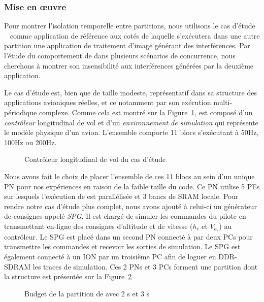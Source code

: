 \documentclass[main.tex]{subfiles}
\begin{document}
\subsubsection{Mise en \oe{}uvre}
Pour montrer l'isolation temporelle entre partitions, nous utilisons le cas d'étude \rosace~\cite{Pagetti2014} comme application de référence aux cotés de laquelle s'exécutera dans une autre partition une application de traitement d'image générant des interférences. Par l'étude du comportement de \rosace dans plusieurs scénarios de concurrence, nous cherchons à montrer son insensibilité aux interférences générées par la deuxième application.

Le cas d'étude \rosace est, bien que de taille modeste, représentatif dans sa structure des applications avioniques réelles, et ce notamment par son exécution multi-périodique complexe. Comme cela est montré sur la Figure~\ref{fig_resumeFr_rosace}, \rosace est composé d'un \emph{contrôleur} longitudinal de vol et d'un \emph{environnement de simulation} qui représente le modèle physique d'un avion. L'ensemble comporte 11 blocs s'exécutant à 50Hz, 100Hz ou 200Hz. 


\begin{figure}
    \centering
    \scalebox{1.5}{}
    \caption{Contrôleur longitudinal de vol du cas d'étude \rosace}
    \label{fig_resumeFr_rosace}
\end{figure}

Nous avons fait le choix de placer l'ensemble de ces 11 blocs au sein d'un unique PN pour nos expériences en raison de la faible taille du code. Ce PN utilise 5 PEs sur lesquels l'exécution de \rosace est parallélisée et 3 bancs de SRAM locale. Pour rendre notre cas d'étude plus complet, nous avons ajouté à celui-ci un générateur de consignes appelé \emph{SPG}. Il est chargé de simuler les commandes du pilote en transmettant en-ligne des consignes d'altitude et de vitesse ($h_c$ et $V_{a_c}$) au contrôleur. Le SPG est placé dans un second PN connecté à \rosace par deux PCs pour transmettre les commandes et recevoir les sorties de simulation. Le SPG est également connecté à un ION par un troisième PC afin de loguer en DDR-SDRAM les traces de simulation. Ces 2 PNs et 3 PCs forment une partition dont la structure est présentée sur la Figure~\ref{fig_resumeFr_rosacePartBudget}

\begin{figure}
    \centering
    \scalebox{0.7}{}
    \caption{Budget de la partition de \rosace avec 2 \PN{}s et 3 \PC{}s}
    \label{fig_resumeFr_rosacePartBudget}
\end{figure}
\end{document}
